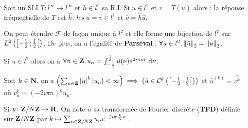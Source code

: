 \begin{pop}
	Soit un SLI $T \colon l^\infty \to l^\infty$ et $h \in l^1$ sa R.I.
	Si $u \in l^1$ et $v = T(u)$ alors : la réponse fréquentielle de $T$ est $\hat{h}$, $h \star u = v \in l^1$ et $\hat{v} = \hat{h} \hat{u}$.
\end{pop}

\begin{thm}
	On peut étendre $\mathcal{F}$ de façon unique à $l^2$ et elle forme une bijection de $l^2$ sur $L^2 \left( \mathopen{}\mathclose{\left[-\frac{1}{2}\mathclose{}\mathpunct{};\frac{1}{2}\right[} \right)$.
	De plus, on a l'égalité de \textbf{Parseval} : $\forall u \in l^2, \left\lVert\hat{u}\right\rVert_2 = \left\lVert u\right\rVert_2$.
\end{thm}

\begin{thm}
	Si $u \in l^2$ alors on a $\forall n \in \mathbf{Z}, u_n = \int_{-\frac{1}{2}}^{\frac{1}{2}} \hat{u}(\nu) e^{2i\pi n\nu} \mathop{}\mathopen{}\mathrm{d} \nu$.
\end{thm}

\begin{thm}
	Soit $k \in \mathbf{N}$, on a $\left( \sum_{n \in \mathbf{Z}} \left\lvert n\right\rvert^k \left\lvert u_n\right\rvert < \infty \right) \implies \left( \hat{u} \in \mathcal{C}^k \left( \mathopen{}\mathclose{\left[-\frac{1}{2}\mathclose{}\mathpunct{};\frac{1}{2}\right[} \right) \right)$ et $\hat{u}^{(k)} = \hat{v^k}$ où $v_n^k = (-2i\pi n)^k u_n$.
\end{thm}

\begin{thm}
	Si $u \colon \mathbf{Z} / N\mathbf{Z} \to \mathbf{R}$.
	On note $\hat{u}$ sa transformée de Fourier discrète (\textbf{TFD}) définie sur $\mathbf{Z} / N\mathbf{Z}$ par $k \mapsto \sum_{n \in \mathbf{Z} / N\mathbf{Z}} u_n e^{-2i\pi \frac{k}{N}n}$.
\end{thm}

